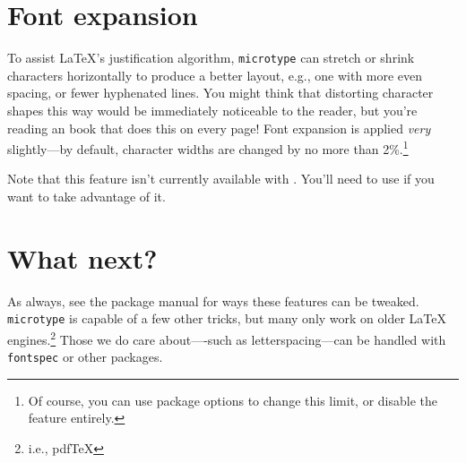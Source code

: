 \section{Font expansion}

To assist \LaTeX's justification algorithm,
\texttt{microtype} can
stretch or shrink characters horizontally to produce a better layout,
e.g., one with more even spacing, or fewer hyphenated lines.
You might think that distorting character shapes this way would be immediately
noticeable to the reader,
but you're reading an book that does this on every page!
Font expansion is applied \emph{very} slightly---by default,
character widths are changed by no more than 2\%.\punckern\footnote{Of course,
you can use package options to change this limit,
or disable the feature entirely.}

Note that this feature isn't currently available with \XeLaTeX{}.
You'll need to use \LuaLaTeX{} if you want to take advantage of it.

\section{What next?}

As always, see the package manual for ways these features can be tweaked.
\texttt{microtype} is capable of a few other tricks,
but many only work on older \LaTeX{} engines.\punckern\footnote{i.e., pdf\TeX}
Those we do care about----such as letterspacing---can be handled with
\texttt{fontspec} or other packages.
